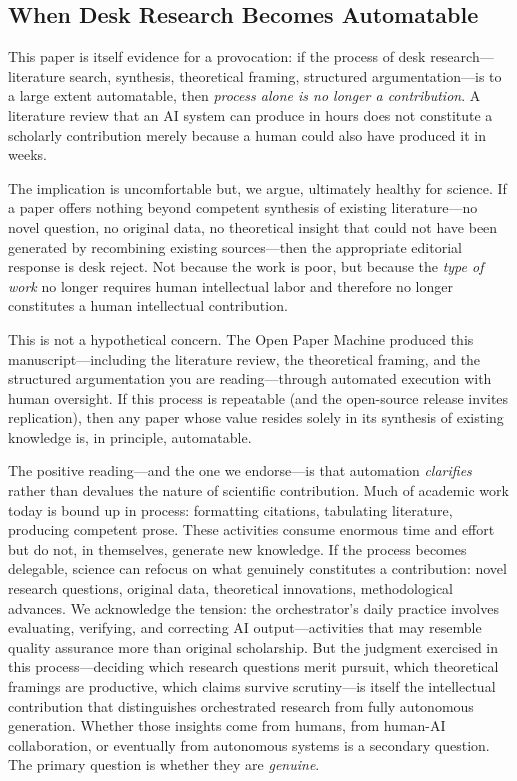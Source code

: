 \documentclass{article}
\begin{document}
\subsection{When Desk Research Becomes Automatable}

This paper is itself evidence for a provocation: if the process of desk research---literature search, synthesis, theoretical framing, structured argumentation---is to a large extent automatable, then \textit{process alone is no longer a contribution}. A literature review that an AI system can produce in hours does not constitute a scholarly contribution merely because a human could also have produced it in weeks.

The implication is uncomfortable but, we argue, ultimately healthy for science. If a paper offers nothing beyond competent synthesis of existing literature---no novel question, no original data, no theoretical insight that could not have been generated by recombining existing sources---then the appropriate editorial response is desk reject. Not because the work is poor, but because the \textit{type of work} no longer requires human intellectual labor and therefore no longer constitutes a human intellectual contribution.

This is not a hypothetical concern. The Open Paper Machine produced this manuscript---including the literature review, the theoretical framing, and the structured argumentation you are reading---through automated execution with human oversight. If this process is repeatable (and the open-source release invites replication), then any paper whose value resides solely in its synthesis of existing knowledge is, in principle, automatable.

The positive reading---and the one we endorse---is that automation \textit{clarifies} rather than devalues the nature of scientific contribution. Much of academic work today is bound up in process: formatting citations, tabulating literature, producing competent prose. These activities consume enormous time and effort but do not, in themselves, generate new knowledge. If the process becomes delegable, science can refocus on what genuinely constitutes a contribution: novel research questions, original data, theoretical innovations, methodological advances. We acknowledge the tension: the orchestrator's daily practice involves evaluating, verifying, and correcting AI output---activities that may resemble quality assurance more than original scholarship. But the judgment exercised in this process---deciding which research questions merit pursuit, which theoretical framings are productive, which claims survive scrutiny---is itself the intellectual contribution that distinguishes orchestrated research from fully autonomous generation. Whether those insights come from humans, from human-AI collaboration, or eventually from autonomous systems is a secondary question. The primary question is whether they are \textit{genuine}.
\end{document}
